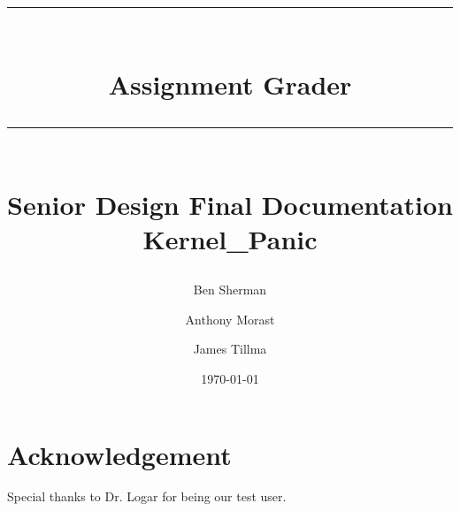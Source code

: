 \documentclass{book}
\title{{\color{MSBlue1} \rule{\linewidth}{0.5mm}}\\[2mm] {\huge \bfseries \color{MSBlue1} Assignment Grader }\\[-1mm] {\color{MSBlue1}\rule{\linewidth}{0.5mm}} \\  \vfill
{\LARGE \bfseries \color{MSBlue2} Senior Design Final Documentation }\\  \vfill 
{\color{MSBlue1} Kernel\_Panic} }
\author{\color{MSBlue1}  Ben Sherman \and \color{MSBlue1} Anthony Morast \and  \color{MSBlue1} James Tillma }
\date{\color{MSBlue1} \today}
\begin{document}
\frontmatter
\maketitle


\tableofcontents
\listoffigures
\listofalgorithms




 
\mainmatter










%


\backmatter
\chapter{Acknowledgement}
\label{SpecialThanks}  Special thanks to Dr. Logar for being our test user.

%
\setcounter{section}{0}

%

%


%
%
\end{document}
